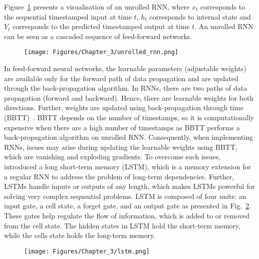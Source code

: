 Figure~\ref{unrolled_rnn} presents a visualisation of an unrolled RNN, where \(x_{t}\) corresponds to the sequential timestamped input at time \(t\), \(h_{t}\) corresponds to internal state  and \(Y_{t}\) corresponds to the predicted timestamped output at time \(t\).
An unrolled RNN can be seen as a cascaded sequence of feed-forward networks.
\begin{figure}
	\begin{center}
	\texttt{[image: Figures/Chapter\_3/unrolled\_rnn.png]}
	\end{center}
	\label{unrolled_rnn}
\end{figure}

In feed-forward neural networks, the learnable parameters (adjustable weights) are available only for the forward path of data propagation and are updated through the back-propagation algorithm.
In RNNs, there are two paths of data propagation (forward and backward). 
Hence, there are learnable weights for both directions.
Further, weights are updated using back-propagation through time (BBTT)~\cite{Werbos1990}.
BBTT depends on the number of timestamps, so it is computationally expensive when there are a high number of timestamps as BBTT performs a back-propagation algorithm on unrolled RNN.
Consequently, when implementing RNNs, issues may arise during updating the learnable weights using BBTT, which are vanishing and exploding gradients.
To overcome such issues, ~\textcite{Hochreiter1997} introduced a long short-term memory (LSTM), which is a memory extension for a regular RNN to address the problem of long-term dependencies.
Further, LSTMs handle inputs or outputs of any length, which makes LSTMs powerful for solving very complex sequential problems.
LSTM is composed of four units: an input gate, a cell state, a forget gate, and an output gate as presented in Fig.~\ref{fig:lstm}.
These gates help regulate the flow of information, which is added to or removed from the cell state. 
The hidden states in LSTM hold the short-term memory, while the cells state holds the long-term memory.
\begin{figure}[h!]
	\begin{center}
		\texttt{[image: Figures/Chapter\_3/lstm.png]}
	\end{center}
	\label{fig:lstm}
\end{figure}

